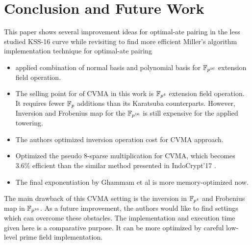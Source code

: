 \section{Conclusion and Future Work}\label{sec:5}
This paper shows several improvement ideas for optimal-ate pairing in the less studied KSS-16 curve while revisiting \cite{INDOCRYPT:KNGDNK17} to find more efficient Miller's algorithm implementation technique for optimal-ate pairing
\begin{itemize}
	\item applied combination of normal basis  and polynomial basis for $\mathbb{F}_{p^{16}}$ extension field operation.
\item	The selling point for of CVMA in this work is $\mathbb{F}_{p^4}$ extension field operation. 
	It requires fewer $\mathbb{F}_p$ additions than its Karatsuba counterparts. 
	However, Inversion and Frobenius map for the $\mathbb{F}_{p^{16}}$ is still expensive for the applied towering.
	\item The authors optimized inversion operation cost for CVMA approach.
	\item  Optimized the pseudo 8-sparse multiplication for CVMA, which becomes $3.6\%$ efficient than the similar method presented in IndoCrypt'17 \cite{INDOCRYPT:KNGDNK17}.
	\item  The final exponentiation by Ghammam et al \cite{EPRINT:GhaFou16b} is more memory-optimized now. 
\end{itemize}
The main drawback of this CVMA setting is the inversion in $\mathbb{F}_{p^4}$ and Frobenius map in $\mathbb{F}_{p^{16}}$.
As a future improvement, the authors would like to find settings which can overcome these obstacles. 
The implementation and execution time given here is a comparative purpose. It can be more optimized by careful low-level prime field implementation.

